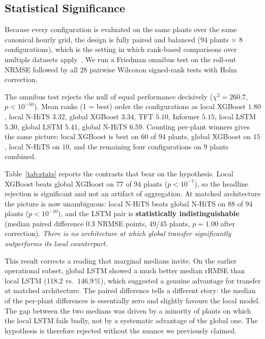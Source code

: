 \documentclass[conference]{IEEEtran}
\begin{document}
\subsection{Statistical Significance}
\label{sec:stats}
Because every configuration is evaluated on the same plants over the same canonical hourly
grid, the design is fully paired and balanced ($94$ plants $\times$ $8$ configurations), which
is the setting in which rank-based comparisons over multiple datasets
apply~\cite{Demsar2006}. We run a Friedman omnibus test on the roll-out NRMSE followed by all
$28$ pairwise Wilcoxon signed-rank tests with Holm correction.

The omnibus test rejects the null of equal performance decisively
($\chi^2=260.7$, $p<10^{-50}$). Mean ranks (1 = best) order the configurations as local
XGBoost $1.80$, local N-HiTS $3.32$, global XGBoost $3.34$, TFT $5.10$, Informer $5.15$,
local LSTM $5.30$, global LSTM $5.41$, global N-HiTS $6.59$. Counting per-plant winners gives
the same picture: local XGBoost is best on $60$ of $94$ plants, global XGBoost on $15$, local
N-HiTS on $10$, and the remaining four configurations on $9$ plants combined.

Table~\ref{tab:stats} reports the contrasts that bear on the hypothesis. Local XGBoost beats
global XGBoost on $77$ of $94$ plants ($p<10^{-7}$), so the headline rejection is significant
and not an artifact of aggregation. At matched architecture the picture is now unambiguous:
local N-HiTS beats global N-HiTS on $88$ of $94$ plants ($p<10^{-10}$), and the LSTM pair is
\textbf{statistically indistinguishable} (median paired difference $0.3$ NRMSE points,
$49$/$45$ plants, $p=1.00$ after correction). \emph{There is no architecture at which global
transfer significantly outperforms its local counterpart.}

\begin{table}[t]
\centering
\caption{Key contrasts on roll-out NRMSE over 94 plants. Paired Wilcoxon signed-rank with
Holm correction; ``Wins'' counts plants on which the first configuration is better. A dash
means the difference is not significant at $\alpha=0.05$.}
\label{tab:stats}

\end{table}

This result corrects a reading that marginal medians invite. On the earlier operational
subset, global LSTM showed a much better median rRMSE than local LSTM ($118.2$ vs.\
$146.9$\,\%), which suggested a genuine advantage for transfer at matched architecture. The
paired difference tells a different story: the median of the per-plant differences is
essentially zero and slightly favours the local model. The gap between the two medians was
driven by a minority of plants on which the local LSTM fails badly, not by a systematic
advantage of the global one. The hypothesis is therefore rejected without the nuance we
previously claimed.
\end{document}
